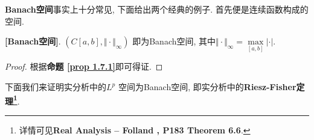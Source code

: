 	\vspace{4em}
	
	\textbf{Banach空间}事实上十分常见, 下面给出两个经典的例子. 首先便是连续函数构成的空间.
	\begin{example}\label{ex 2.1.2}
		\textbf{[Banach空间]}. 
		$(C[a , b] , \Vert \cdot \Vert_{\infty})$ 即为Banach空间, 其中$\Vert \cdot \Vert_{\infty} = \underset{[a , b]}{\max} \left| \cdot \right|$. 
			
		\vspace{1em}
			
		\begin{proof}
			根据\textbf{命题 \ref{prop 1.7.1}}即可得证. 
		\end{proof}
	\end{example}
	
	
	\vspace{6em}
	下面我们来证明实分析中的$L^p$ 空间为Banach空间, 即实分析中的\textbf{Riesz-Fisher定理\footnote{详情可见\textbf{Real Analysis -- Folland , P183 Theorem 6.6}.}}. 
